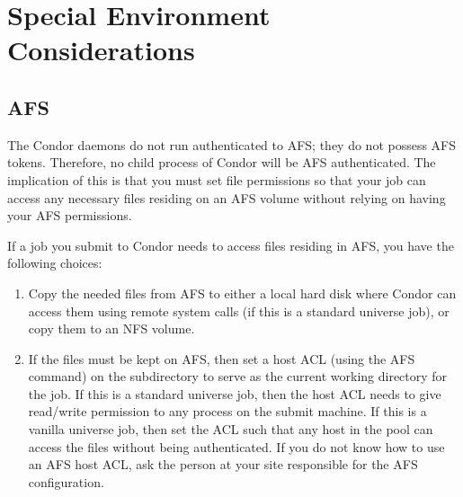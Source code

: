 

%





\section{Special Environment Considerations}

\subsection{AFS}

The Condor daemons do not run authenticated to AFS; they do not possess
AFS tokens.
Therefore, no child process of Condor will be AFS authenticated.
The implication of this is that you must set file permissions so
that your job can access any necessary files residing on an AFS volume
without relying on having your AFS permissions.

If a job you submit to Condor needs to access files residing in AFS,
you have the following choices:
\begin{enumerate}
\item Copy the needed files from AFS to either a local hard disk where 
Condor can access them using remote system calls (if
this is a standard universe job), or copy them to an NFS volume.
\item If the files must be kept on AFS, then set a host ACL
(using the AFS  command) on the subdirectory to
serve as the current working directory for the job.
If this is a standard universe job, then the host ACL needs
to give read/write permission to any process on the submit machine.
If this is a vanilla universe job, then set the ACL such that any host 
in the pool can access the files without being authenticated.
If you do not know how to use an AFS host ACL, ask the person at your 
site responsible for the AFS configuration.
\end{enumerate}


